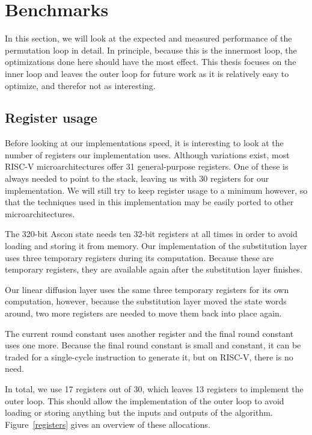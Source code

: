 \section{Benchmarks}

In this section, we will look at the expected and measured performance of the
permutation loop in detail. In principle, because this is the innermost loop,
the optimizations done here should have the most effect. This thesis focuses on
the inner loop and leaves the outer loop for future work as it is relatively
easy to optimize, and therefor not as interesting.

\subsection{Register usage}

Before looking at our implementations speed, it is interesting to look at the
number of registers our implementation uses. Although variations exist, most
RISC-V microarchitectures offer 31 general-purpose registers. One of these is
always needed to point to the stack, leaving us with 30 registers for our
implementation. We will still try to keep register usage to a minimum however,
so that the techniques used in this implementation may be easily ported to other
microarchitectures.

The 320-bit Ascon state needs ten 32-bit registers at all times in order to
avoid loading and storing it from memory. Our implementation of the substitution
layer uses three temporary registers during its computation. Because these are
temporary registers, they are available again after the substitution layer
finishes.

Our linear diffusion layer uses the same three temporary registers for its own
computation, however, because the substitution layer moved the state words
around, two more registers are needed to move them back into place again.

The current round constant uses another register and the final round constant
uses one more. Because the final round constant is small and constant, it can be
traded for a single-cycle instruction to generate it, but on RISC-V, there is no
need.

In total, we use 17 registers out of 30, which leaves 13 registers to implement
the outer loop. This should allow the implementation of the outer loop to avoid
loading or storing anything but the inputs and outputs of the algorithm.
Figure~\ref{registers} gives an overview of these allocations.

